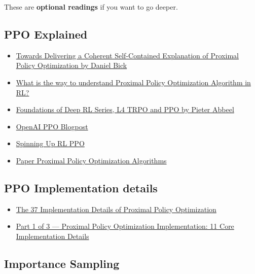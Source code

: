 \documentclass[11pt,a4paper]{article}
\begin{document}
These are \textbf{optional readings} if you want to go deeper.

\subsection{PPO Explained}\label{ppo-explained}

\begin{itemize}
\tightlist
\item
  \href{https://fse.studenttheses.ub.rug.nl/25709/1/mAI_2021_BickD.pdf}{Towards Delivering a Coherent Self-Contained Explanation of Proximal Policy Optimization by Daniel Bick}
\item
  \href{https://stackoverflow.com/questions/46422845/what-is-the-way-to-understand-proximal-policy-optimization-algorithm-in-rl}{What is the way to understand Proximal Policy Optimization Algorithm in RL?}
\item
  \href{https://youtu.be/KjWF8VIMGiY}{Foundations of Deep RL Series, L4 TRPO and PPO by Pieter Abbeel}
\item
  \href{https://openai.com/blog/openai-baselines-ppo/}{OpenAI PPO Blogpost}
\item
  \href{https://spinningup.openai.com/en/latest/algorithms/ppo.html}{Spinning Up RL PPO}
\item
  \href{https://arxiv.org/abs/1707.06347}{Paper Proximal Policy Optimization Algorithms}
\end{itemize}

\subsection{PPO Implementation details}\label{ppo-implementation-details}

\begin{itemize}
\tightlist
\item
  \href{https://iclr-blog-track.github.io/2022/03/25/ppo-implementation-details/}{The 37 Implementation Details of Proximal Policy Optimization}
\item
  \href{https://www.youtube.com/watch?v=MEt6rrxH8W4}{Part 1 of 3 --- Proximal Policy Optimization Implementation: 11 Core Implementation Details}
\end{itemize}

\subsection{Importance Sampling}\label{importance-sampling}
\end{document}
